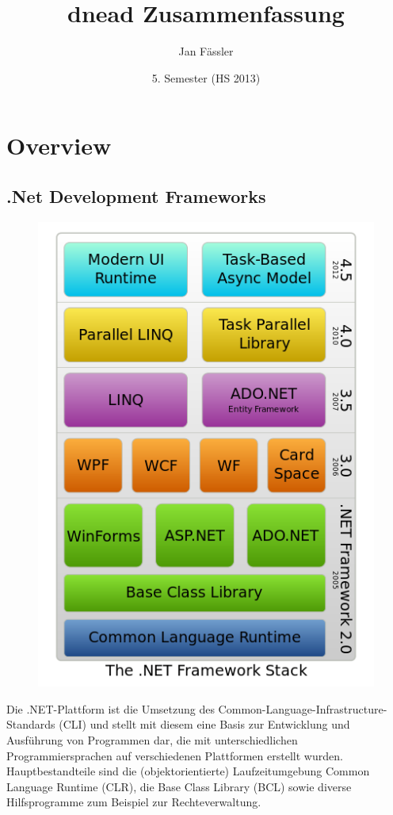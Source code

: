 \documentclass[10pt]{article}
\title{
	\vspace{5cm}
	dnead Zusammenfassung
}
\author{Jan Fässler}
\date{5. Semester (HS 2013)}
\begin{document}
\maketitle
\thispagestyle{fancy}

\newpage

\tableofcontents	  	


\newpage
\setcounter{page}{1}


\section{Overview}
\subsection{.Net Development Frameworks}
\begin{figure}
\includegraphics[scale=0.4]{DotNet.png}
\end{figure}
Die .NET-Plattform ist die Umsetzung des Common-Language-Infrastructure-Standards (CLI) und stellt mit diesem eine Basis zur Entwicklung und Ausführung von Programmen dar, die mit unterschiedlichen Programmiersprachen auf verschiedenen Plattformen erstellt wurden. Hauptbestandteile sind die (objektorientierte) Laufzeitumgebung Common Language Runtime (CLR), die Base Class Library (BCL) sowie diverse Hilfsprogramme zum Beispiel zur Rechteverwaltung. 
\end{document}
